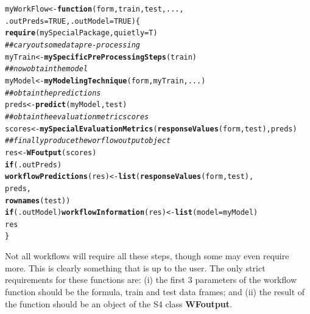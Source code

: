 \documentclass[10pt,a4paper]{article}\usepackage[]{graphicx}\usepackage[]{color}
\makeatletter
\newcommand{\hlnum}[1]{\textcolor[rgb]{0.686,0.059,0.569}{#1}}%
\newcommand{\hlcom}[1]{\textcolor[rgb]{0.678,0.584,0.686}{\textit{#1}}}%
\newcommand{\hlstd}[1]{\textcolor[rgb]{0.345,0.345,0.345}{#1}}%
\newcommand{\hlkwa}[1]{\textcolor[rgb]{0.161,0.373,0.58}{\textbf{#1}}}%
\newcommand{\hlkwb}[1]{\textcolor[rgb]{0.69,0.353,0.396}{#1}}%
\newcommand{\hlkwc}[1]{\textcolor[rgb]{0.333,0.667,0.333}{#1}}%
\newcommand{\hlkwd}[1]{\textcolor[rgb]{0.737,0.353,0.396}{\textbf{#1}}}%
\newenvironment{kframe}{%
 \def\at@end@of@kframe{}%
 \ifinner\ifhmode%
  \def\at@end@of@kframe{\end{minipage}}%
  \begin{minipage}{\columnwidth}%
 \fi\fi%
 \def\FrameCommand##1{\hskip\@totalleftmargin \hskip-\fboxsep
 \colorbox{shadecolor}{##1}\hskip-\fboxsep
     \hskip-\linewidth \hskip-\@totalleftmargin \hskip\columnwidth}%
 \MakeFramed {\advance\hsize-\width
   \@totalleftmargin\z@ \linewidth\hsize
   \@setminipage}}%
 {\par\unskip\endMakeFramed%
 \at@end@of@kframe}
\newenvironment{knitrout}{}{} %
\makeatother
\begin{document}
\begin{knitrout}\small
{}\color{fgcolor}\begin{kframe}
\begin{alltt}
\hlstd{myWorkFlow} \hlkwb{<-} \hlkwa{function}\hlstd{(}\hlkwc{form}\hlstd{,}\hlkwc{train}\hlstd{,}\hlkwc{test}\hlstd{,}\hlkwc{...}\hlstd{,}
                       \hlkwc{.outPreds}\hlstd{=}\hlnum{TRUE}\hlstd{,} \hlkwc{.outModel}\hlstd{=}\hlnum{TRUE}\hlstd{) \{}
  \hlkwd{require}\hlstd{(mySpecialPackage,}\hlkwc{quietly}\hlstd{=T)}
  \hlcom{## cary out some data pre-processing}
  \hlstd{myTrain} \hlkwb{<-} \hlkwd{mySpecificPreProcessingSteps}\hlstd{(train)}
  \hlcom{## now obtain the model}
  \hlstd{myModel} \hlkwb{<-} \hlkwd{myModelingTechnique}\hlstd{(form,myTrain,...)}
  \hlcom{## obtain the predictions}
  \hlstd{preds} \hlkwb{<-} \hlkwd{predict}\hlstd{(myModel,test)}
  \hlcom{## obtain the evaluation metric scores}
  \hlstd{scores} \hlkwb{<-} \hlkwd{mySpecialEvaluationMetrics}\hlstd{(}\hlkwd{responseValues}\hlstd{(form,test),preds)}
  \hlcom{## finally produce the worflow output object}
  \hlstd{res} \hlkwb{<-} \hlkwd{WFoutput}\hlstd{(scores)}
  \hlkwa{if} \hlstd{(.outPreds)}
      \hlkwd{workflowPredictions}\hlstd{(res)} \hlkwb{<-} \hlkwd{list}\hlstd{(}\hlkwd{responseValues}\hlstd{(form,test),}
                                       \hlstd{preds,}
                                       \hlkwd{rownames}\hlstd{(test))}
  \hlkwa{if} \hlstd{(.outModel)} \hlkwd{workflowInformation}\hlstd{(res)} \hlkwb{<-} \hlkwd{list}\hlstd{(}\hlkwc{model}\hlstd{=myModel)}
  \hlstd{res}
\hlstd{\}}
\end{alltt}
\end{kframe}
\end{knitrout}



Not all workflows will require all these steps, though some may even
require more. This is clearly something that is up to the user. The
only strict requirements for these functions are: (i) the first 3 parameters
of the workflow function should be the formula, train and test data
frames; and (ii) the result of the function should be an object of the S4 class \textbf{WFoutput}.
\end{document}
